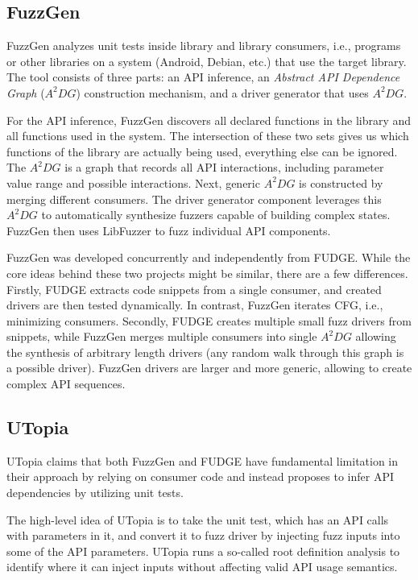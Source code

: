 \documentclass[a4paper,11pt,oneside]{report}
\begin{document}
\subsection{FuzzGen}
FuzzGen analyzes unit tests inside library and library consumers, 
i.e., programs or other libraries on a system (Android, Debian, etc.) 
that use the target library. The tool consists of three parts: an 
API inference, an \emph{Abstract API Dependence Graph} ($A^{2}DG$)
construction mechanism, and a driver generator that uses $A^{2}DG$. 

For the API inference, FuzzGen discovers all declared functions
in the library and all functions used in the system. The intersection
of these two sets gives us which functions of the library
are actually being used, everything else can be ignored.
The $A^{2}DG$ is a graph that records all API interactions, 
including parameter value range and possible interactions. 
Next, generic $A^{2}DG$ is constructed by merging different consumers.
The driver generator component leverages this $A^{2}DG$ 
to automatically synthesize fuzzers capable of building complex states.
FuzzGen then uses LibFuzzer to fuzz individual API components.

FuzzGen was developed concurrently and independently from FUDGE. 
While the core ideas behind these two projects might be similar, 
there are a few differences. Firstly, FUDGE extracts code snippets 
from a single consumer, and created drivers are then
tested dynamically. In contrast, FuzzGen iterates CFG, i.e., minimizing 
consumers. Secondly, FUDGE creates multiple small fuzz drivers from snippets,
while FuzzGen merges multiple consumers into single
$A^{2}DG$ allowing the synthesis of arbitrary length drivers 
(any random walk through this graph is a possible driver). 
FuzzGen drivers are larger and more generic, allowing 
to create complex API sequences.

\subsection{UTopia}
UTopia claims that both FuzzGen and FUDGE have fundamental 
limitation in their approach by relying on consumer code and instead
proposes to infer API dependencies by utilizing unit tests. 

The high-level idea of UTopia is to take the unit test, which has an API
calls with parameters in it, and convert it to fuzz driver by injecting 
fuzz inputs into some of the API parameters. UTopia runs a 
so-called root definition analysis to identify where it can 
inject inputs without affecting valid API usage semantics.
\end{document}
